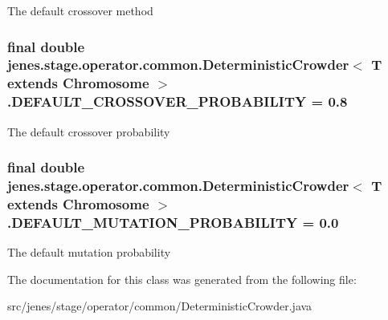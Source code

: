 The default crossover method \hypertarget{classjenes_1_1stage_1_1operator_1_1common_1_1_deterministic_crowder_3_01_t_01extends_01_chromosome_01_4_824ea51baffd4e4b2fb045d38b964321}{
\subsubsection[DEFAULT\_\-CROSSOVER\_\-PROBABILITY]{\setlength{\rightskip}{0pt plus 5cm}final double jenes.stage.operator.common.DeterministicCrowder$<$ T extends Chromosome $>$.{\bf DEFAULT\_\-CROSSOVER\_\-PROBABILITY} = 0.8}}
\label{classjenes_1_1stage_1_1operator_1_1common_1_1_deterministic_crowder_3_01_t_01extends_01_chromosome_01_4_824ea51baffd4e4b2fb045d38b964321}


The default crossover probability \hypertarget{classjenes_1_1stage_1_1operator_1_1common_1_1_deterministic_crowder_3_01_t_01extends_01_chromosome_01_4_5a4e77ddc158a661371ea5934cce2977}{
\subsubsection[DEFAULT\_\-MUTATION\_\-PROBABILITY]{\setlength{\rightskip}{0pt plus 5cm}final double jenes.stage.operator.common.DeterministicCrowder$<$ T extends Chromosome $>$.{\bf DEFAULT\_\-MUTATION\_\-PROBABILITY} = 0.0}}
\label{classjenes_1_1stage_1_1operator_1_1common_1_1_deterministic_crowder_3_01_t_01extends_01_chromosome_01_4_5a4e77ddc158a661371ea5934cce2977}


The default mutation probability 

The documentation for this class was generated from the following file:\begin{CompactItemize}
\item 
src/jenes/stage/operator/common/DeterministicCrowder.java\end{CompactItemize}
